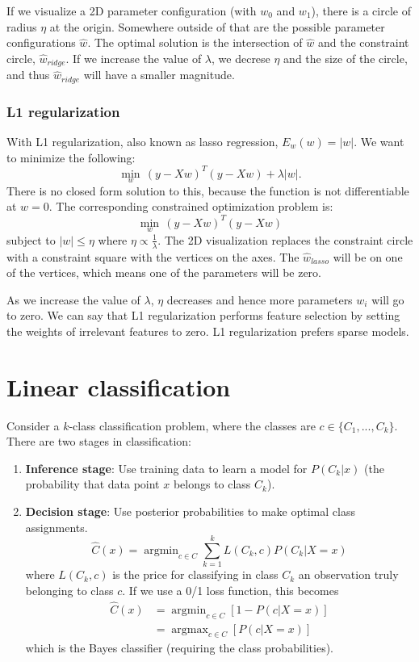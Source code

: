 \documentclass[a4paper,12pt]{article}
\DeclareMathOperator*{\argmin}{argmin}
\DeclareMathOperator*{\argmax}{argmax}
\begin{document}
If we visualize a 2D parameter configuration (with $w_0$ and $w_1$), there is a circle of radius $\eta$ at the origin. Somewhere outside of that are the possible parameter configurations $\hat w$. The optimal solution is the intersection of $\hat w$ and the constraint circle, $\hat w_{ridge}$. If we increase the value of $\lambda$, we decrese $\eta$ and the size of the circle, and thus $\hat w_{ridge}$ will have a smaller magnitude. 

\subsubsection{L1 regularization}

With L1 regularization, also known as lasso regression, $E_w(w) = |w|$. We want to minimize the following: 
$$\min_w \, (y-Xw)^T(y-Xw) + \lambda |w|.$$
There is no closed form solution to this, because the function is not differentiable at $w=0$. The corresponding constrained optimization problem is: 
$$\min_w \, (y-Xw)^T(y-Xw)$$
subject to $|w| \leq \eta$ where $\eta \propto \frac{1}{\lambda}$. The 2D visualization replaces the constraint circle with a constraint square with the vertices on the axes. The $\hat w_{lasso}$ will be on one of the vertices, which means one of the parameters will be zero. 

As we increase the value of $\lambda$, $\eta$ decreases and hence more parameters $w_i$ will go to zero. We can say that L1 regularization performs feature selection by setting the weights of irrelevant features to zero. L1 regularization prefers sparse models. 




\clearpage

\section{Linear classification}

Consider a $k$-class classification problem, where the classes are $c \in \{C_1, ..., C_k\}$. There are two stages in classification: 
\begin{enumerate}
\item
\textbf{Inference stage}: Use training data to learn a model for $P(C_k|x)$ (the probability that data point $x$ belongs to class $C_k$). 
\item
\textbf{Decision stage}: Use posterior probabilities to make optimal class assignments. 
$$\hat C(x) = \argmin_{c\in C} \sum_{k=1}^k L(C_k, c) P(C_k|X=x)$$
where $L(C_k, c)$ is the price for classifying in class $C_k$ an observation truly belonging to class $c$. If we use a 0/1 loss function, this becomes 
\begin{align*}
\hat C(x) &= \argmin_{c\in C} [1-P(c|X=x)] \\
		&= \argmax_{c\in C} [P(c|X=x)]
\end{align*}
which is the Bayes classifier (requiring the class probabilities). 
\end{enumerate}
\end{document}
